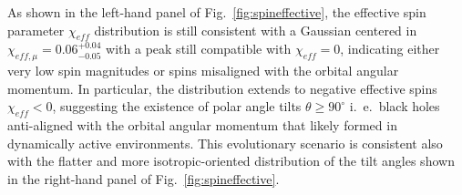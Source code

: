 \documentclass[a4paper,titlepage]{book}     	%
\begin{document}
As shown in the left-hand panel of Fig.\ \ref{fig:spineffective}, the effective spin parameter $\chi_{eff}$ distribution is still consistent with a Gaussian centered in $\chi_{eff, \mu} = 0.06_{-0.05}^{+0.04}$ with a peak still compatible with $\chi_{eff} = 0$, indicating either very low spin magnitudes or spins misaligned with the orbital angular momentum. In particular, the distribution extends to negative effective spins $\chi_{eff} < 0$, suggesting the existence of polar angle tilts $\theta \geq 90^\circ $ i.\ e.\ black holes anti-aligned with the orbital angular momentum that likely formed in dynamically active environments. This evolutionary scenario is consistent also with the flatter and more isotropic-oriented distribution of the tilt angles shown in the right-hand panel of Fig.\ \ref{fig:spineffective}. 
\end{document}
